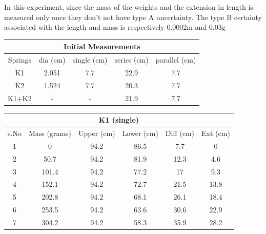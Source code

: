 In this experiment, since the mass of the weights and the extension in length is measured only once they don't not have type A uncertainty. The type B certainty associated with the length and mass is respectively 0.0002m and 0.03g

\begin{center}
    
\begin{tabular}{|c|c|c|c|c|}
\hline
\multicolumn{5}{|c|}{\textbf{Initial Measurements}}                     \\ \hline
Springs & dia   (cm) & single   (cm) & series   (cm) & parallel   (cm) \\ \hline
K1      & 2.051      & 7.7           & 22.9          & 7.7             \\ \hline
K2      & 1.524      & 7.7           & 20.3          & 7.7             \\ \hline
K1+K2   & -          & -             & 21.9          & 7.7             \\ \hline
\end{tabular}
\end{center}

\begin{center}
\begin{tabular}{|c|c|c|c|c|c|}
\hline
\multicolumn{6}{|c|}{\textbf{K1 (single)}}                                          \\ \hline
s.No & Mass   (grams) & Upper   (cm) & Lower   (cm) & Diff     (cm) & Ext      (cm) \\ \hline
1    & 0              & 94.2         & 86.5         & 7.7           & 0             \\ \hline
2    & 50.7           & 94.2         & 81.9         & 12.3          & 4.6           \\ \hline
3    & 101.4          & 94.2         & 77.2         & 17            & 9.3           \\ \hline
4    & 152.1          & 94.2         & 72.7         & 21.5          & 13.8          \\ \hline
5    & 202.8          & 94.2         & 68.1         & 26.1          & 18.4          \\ \hline
6    & 253.5          & 94.2         & 63.6         & 30.6          & 22.9          \\ \hline
7    & 304.2          & 94.2         & 58.3         & 35.9          & 28.2          \\ \hline
\end{tabular}
\end{center}

